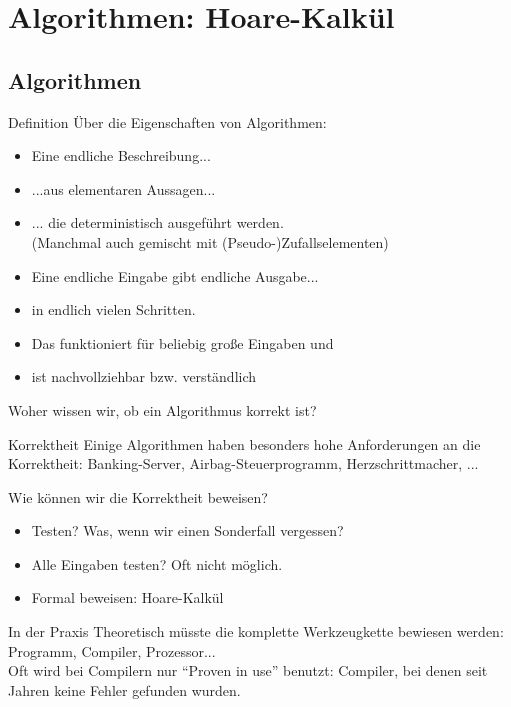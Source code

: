 \renewcommand{\assert}[1]{\ensuremath{\{\;#1\;\}}}

\section{Algorithmen: Hoare-Kalkül}

\subsection{Algorithmen}
\begin{frame}
	\begin{block}{Definition}
		Über die Eigenschaften von Algorithmen:
		\begin{itemize}[<+->]
			\item Eine endliche Beschreibung...
			\item ...aus elementaren Aussagen...
			\item ... die deterministisch ausgeführt werden.\\
				(Manchmal auch gemischt mit (Pseudo-)Zufallselementen)
			\item Eine endliche Eingabe gibt endliche Ausgabe...
			\item in endlich vielen Schritten.
			\item Das funktioniert für beliebig große Eingaben und
			\item ist nachvollziehbar bzw. verständlich
		\end{itemize}
	\end{block}
	\pause
	Woher wissen wir, ob ein Algorithmus korrekt ist?
\end{frame}

\begin{frame}{Korrektheit}
	Einige Algorithmen haben besonders hohe Anforderungen an die Korrektheit:
	Banking-Server, Airbag-Steuerprogramm, Herzschrittmacher, ...
	\bigskip

	\pause
	Wie können wir die Korrektheit beweisen?
	\begin{itemize}[<+->]
		\item Testen? Was, wenn wir einen Sonderfall vergessen?
		\item Alle Eingaben testen? Oft nicht möglich.
		\item Formal beweisen: Hoare-Kalkül
	\end{itemize}
	
	\pause
	\begin{block}{In der Praxis}
		Theoretisch müsste die komplette Werkzeugkette bewiesen werden:
		Programm, Compiler, Prozessor...\\
		Oft wird bei Compilern nur “Proven in use” benutzt: Compiler, bei
		denen seit Jahren keine Fehler gefunden wurden.
	\end{block}
	
\end{frame}

